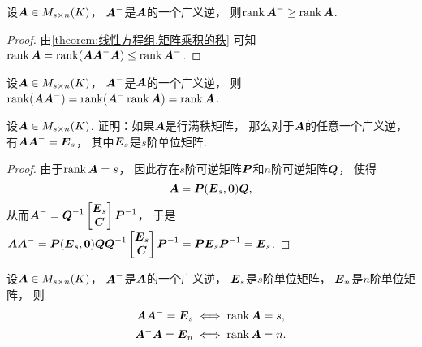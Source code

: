 \begin{property}
设\(\boldsymbol{A} \in M_{s \times n}(K)\)，
\(\boldsymbol{A}^-\)是\(\boldsymbol{A}\)的一个广义逆，
则\(\rank\boldsymbol{A}^- \geq \rank\boldsymbol{A}\).
\begin{proof}
由\cref{theorem:线性方程组.矩阵乘积的秩} 可知\(
	\rank\boldsymbol{A}
	= \rank(\boldsymbol{A} \boldsymbol{A}^- \boldsymbol{A})
	\leq \rank\boldsymbol{A}^-
\).
\end{proof}
\end{property}

\begin{property}
设\(\boldsymbol{A} \in M_{s \times n}(K)\)，
\(\boldsymbol{A}^-\)是\(\boldsymbol{A}\)的一个广义逆，
则\(
	\rank(\boldsymbol{A} \boldsymbol{A}^-)
	= \rank(\boldsymbol{A}^- \rank\boldsymbol{A})
	= \rank\boldsymbol{A}
\).
\end{property}

\begin{example}
设\(\boldsymbol{A} \in M_{s \times n}(K)\).
证明：如果\(\boldsymbol{A}\)是行满秩矩阵，
那么对于\(\boldsymbol{A}\)的任意一个广义逆，
有\(\boldsymbol{A} \boldsymbol{A}^- = \boldsymbol{E}_s\)，
其中\(\boldsymbol{E}_s\)是\(s\)阶单位矩阵.
\begin{proof}
由于\(\rank\boldsymbol{A} = s\)，
因此存在\(s\)阶可逆矩阵\(\boldsymbol{P}\)和\(n\)阶可逆矩阵\(\boldsymbol{Q}\)，
使得\begin{equation*}
	\boldsymbol{A} = \boldsymbol{P} (\boldsymbol{E}_s,\boldsymbol0) \boldsymbol{Q},
\end{equation*}
从而\(
	\boldsymbol{A}^-
	= \boldsymbol{Q}^{-1}
	\begin{bmatrix}
		\boldsymbol{E}_s \\
		\boldsymbol{C}
	\end{bmatrix}
	\boldsymbol{P}^{-1}
\)，
于是\(
	\boldsymbol{A} \boldsymbol{A}^-
	= \boldsymbol{P}
	(\boldsymbol{E}_s,\boldsymbol0)
	\boldsymbol{Q}
	\boldsymbol{Q}^{-1}
	\begin{bmatrix}
		\boldsymbol{E}_s \\
		\boldsymbol{C}
	\end{bmatrix}
	\boldsymbol{P}^{-1}
	= \boldsymbol{P} \boldsymbol{E}_s \boldsymbol{P}^{-1}
	= \boldsymbol{E}_s
\).
\end{proof}
\end{example}

\begin{proposition}
设\(\boldsymbol{A} \in M_{s \times n}(K)\)，
\(\boldsymbol{A}^-\)是\(\boldsymbol{A}\)的一个广义逆，
\(\boldsymbol{E}_s\)是\(s\)阶单位矩阵，
\(\boldsymbol{E}_n\)是\(n\)阶单位矩阵，
则\begin{gather*}
	\boldsymbol{A} \boldsymbol{A}^- = \boldsymbol{E}_s
	\iff
	\rank\boldsymbol{A} = s, \\
	\boldsymbol{A}^- \boldsymbol{A} = \boldsymbol{E}_n
	\iff
	\rank\boldsymbol{A} = n.
\end{gather*}
\end{proposition}

